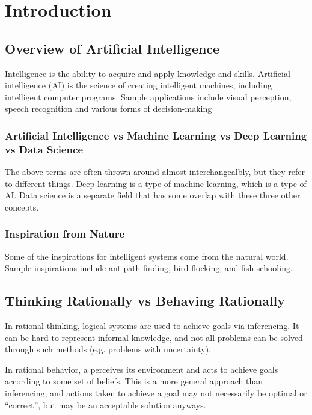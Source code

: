 \documentclass[12pt,titlepage]{article}
\begin{document}
  \newpage

  \section{Introduction}

    \subsection{Overview of Artificial Intelligence}
      Intelligence is the ability to acquire and apply knowledge and skills. Artificial intelligence (AI) is the science of creating intelligent machines,
      including intelligent computer programs. Sample applications include visual perception, speech recognition and various forms of decision-making

      \subsubsection{Artificial Intelligence vs Machine Learning vs Deep Learning vs Data Science}
        The above terms are often thrown around almost interchangealbly, but they refer to different things. Deep learning is
        a type of machine learning, which is a type of AI. Data science is a separate field that has some overlap with these
        three other concepts.

      \subsubsection{Inspiration from Nature}
        Some of the inspirations for intelligent systems come from the natural world. Sample inspirations include ant path-finding,
        bird flocking, and fish schooling.

    \subsection{Thinking Rationally vs Behaving Rationally}
      In rational thinking, logical systems are used to achieve goals via inferencing. It can be hard to represent informal knowledge,
      and not all problems can be solved through such methods (e.g. problems with uncertainty).

      In rational behavior, a perceives its environment and acts to achieve goals according to some set of beliefs. This is a more
      general approach than inferencing, and actions taken to achieve a goal may not necessarily be optimal or ``correct'', but
      may be an acceptable solution anyways.
      
\end{document}
